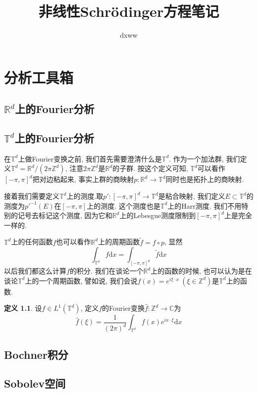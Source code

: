\documentclass{ctexbook}
\title{非线性Schr\"odinger方程笔记}
\author{dxww}
\theoremstyle{definition}
\newtheorem{definition}{定义}[section]
\theoremstyle{remark}
\newcommand{\dif}{\mathrm{d}}
\begin{document}
\maketitle
\tableofcontents

\chapter{分析工具箱}
\section{$\mathbb{R}^d$上的Fourier分析}
\section{$\mathbb{T}^d$上的Fourier分析}
在$\mathbb{T}^d$上做Fourier变换之前, 我们首先需要澄清什么是$\mathbb{T}^d$. 作为一个加法群, 我们定义$\mathbb{T}^d=\mathbb{R}^d/(2\pi\mathbb{Z}^d)$, 注意$2\pi\mathbb{Z}^d$是$\mathbb{R}^d$的子群. 按这个定义可知, $\mathbb{T}^d$可以看作$[-\pi,\pi]^d$把对边粘起来, 事实上群的商映射$p:\mathbb{R}^d\rightarrow\mathbb{T}^d$同时也是拓扑上的商映射. 

接着我们需要定义$\mathbb{T}^d$上的测度.取$p':[-\pi,\pi]^d\rightarrow\mathbb{T}^d$是粘合映射, 我们定义$E\subset\mathbb{T}^d$的测度为$p'^{-1}(E)$在$[-\pi,\pi]$上的测度. 这个测度也是$\mathbb{T}^d$上的Harr测度. 我们不用特别的记号去标记这个测度, 因为它和$\mathbb{R}^d$上的Lebesgue测度限制到$[-\pi,\pi]^d$上是完全一样的. 

$\mathbb{T}^d$上的任何函数$f$也可以看作$\mathbb{R}^d$上的周期函数$\tilde{f}=f\circ p$, 显然
$$\int_{\mathbb{T}^d}f\dif x=\int_{[-\pi,\pi]^d}\tilde{f}\dif x$$
以后我们都这么计算$f$的积分. 我们在谈论一个$\mathbb{R}^d$上的函数的时候, 也可以认为是在谈论$\mathbb{T}^d$上的一个周期函数, 譬如说, 我们会说$f(x)=e^{i\xi\cdot x}\ (\xi\in\mathbb{Z}^d)$是$\mathbb{T}^d$上的函数. 

\begin{definition}
设$f\in L^1(\mathbb{T}^d)$, 定义$f$的Fourier变换$\widehat{f}:\mathbb{Z}^d\rightarrow\mathbb{C}$为
$$\widehat{f}(\xi)=\frac{1}{(2\pi)^d}\int_{\mathbb{T}^d}f(x)e^{ix\cdot\xi}\dif x$$
\end{definition}
\section{Bochner积分}
\section{Sobolev空间}
\end{document}
